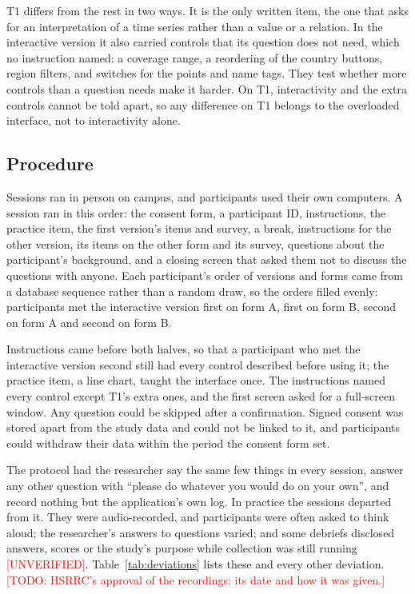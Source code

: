 \documentclass[10pt,twocolumn]{article}
\newcommand{\todo}[1]{\textcolor{red}{[TODO: #1]}}
\newcommand{\unverified}{\textcolor{red}{[UNVERIFIED]}}
\begin{document}
T1 differs from the rest in two ways. It is the only written item, the one that asks for an interpretation of a time series rather than a value or a relation. In the interactive version it also carried  controls that its question does not need, which no instruction named: a coverage range, a reordering of the country buttons, region filters, and switches for the points and name tags. They test whether more controls than a question needs make it harder. On T1, interactivity and the extra controls cannot be told apart, so any difference on T1 belongs to the overloaded interface, not to interactivity alone.

\subsection{Procedure}
\label{sec:procedure}

Sessions ran in person on campus, and participants used their own computers. A session ran in this order: the consent form, a participant ID, instructions, the practice item, the first version's items and survey, a break, instructions for the other version, its items on the other form and its survey, questions about the participant's background, and a closing screen that asked them not to discuss the questions with anyone. Each participant's order of versions and forms came from a database sequence rather than a random draw, so the orders filled evenly:  participants met the interactive version first on form A,  first on form B,  second on form A and  second on form B.

Instructions came before both halves, so that a participant who met the interactive version second still had every control described before using it; the practice item, a line chart, taught the interface once. The instructions named every control except T1's extra ones, and the first screen asked for a full-screen window. Any question could be skipped after a confirmation. Signed consent was stored apart from the study data and could not be linked to it, and participants could withdraw their data within the period the consent form set.

The protocol had the researcher say the same few things in every session, answer any other question with ``please do whatever you would do on your own'', and record nothing but the application's own log. In practice the sessions departed from it. They were audio-recorded, and participants were often asked to think aloud; the researcher's answers to questions varied; and some debriefs disclosed answers, scores or the study's purpose while collection was still running \unverified. Table~\ref{tab:deviations} lists these and every other deviation. \todo{HSRRC's approval of the recordings: its date and how it was given.}
\end{document}
